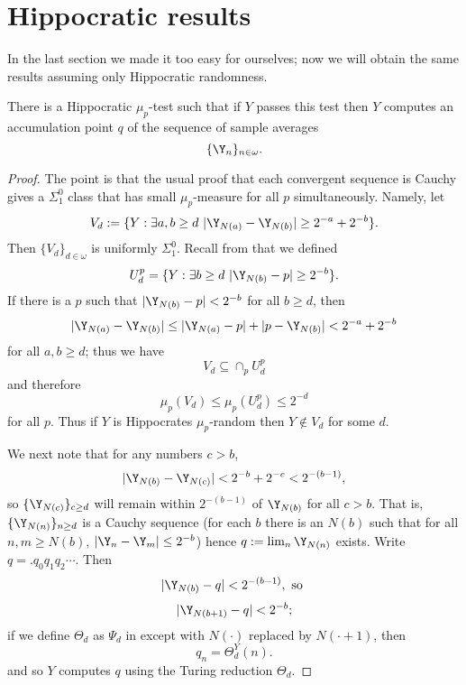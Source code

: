 \section{Hippocratic results}

In the last section we made it too easy for ourselves; now we will obtain the same results assuming only Hippocratic randomness. 

\begin{theorem}\label{accumulate}
There is a Hippocratic $\mu_p$-test such that if $Y$ passes this test then $Y$ computes an accumulation point $q$ of the sequence of sample averages 
\[
\{\Y_n\}_{n\in\omega}.
\] 
\end{theorem}

\begin{proof}
The point is that the usual proof that each convergent sequence is Cauchy gives a $\Sigma^0_1$ class that has small $\mu_p$-measure for all $p$ simultaneously. Namely, let
\[
V_d:=\{Y: \exists a,b\ge d\,\,|\Y_{N(a)}-\Y_{N(b)}|\ge 2^{-a}+ 2^{-b}\}.
\]
Then $\{V_d\}_{d\in\omega}$ is uniformly $\Sigma^0_1$. Recall from  that we defined
\[
U^{p}_d=\{Y:\exists b\ge d\,\, |\Y_{N(b)}-p|\ge 2^{-b}\}.
\]
If there is a $p$ such that $|\Y_{N(b)}-p|<2^{-b}$ for all $b\ge d$, then 
\[
|\Y_{N(a)}-\Y_{N(b)}|\le |\Y_{N(a)}-p|+|p-\Y_{N(b)}|< 2^{-a}+2^{-b}
\]
for all $a,b\ge d$; thus we have 
\[
V_d\subseteq \cap_{p} U^{p}_d
\]
and therefore 
\[
\mu_p(V_d)\le\mu_p(U^{p}_d)\le 2^{-d}
\]
for all $p$. 
 Thus if $Y$ is Hippocrates $\mu_p$-random then $Y\not\in V_d$ for some $d$. %

We next note that for any numbers $c> b$, 
\[
|\Y_{N(b)} - \Y_{N(c)}| < 2^{-b}+2^{-c} < 2^{-(b-1)},
\]
so $\{\Y_{N(c)}\}_{c\ge d}$ will remain within $2^{-(b-1)}$ of $\Y_{N(b)}$ for all $c>b$. That is, $\{\Y_{N(n)}\}_{n\ge d}$ is a Cauchy sequence (for each $b$ there is an $N(b)$ such that for all $n,m\ge N(b)$, $|\Y_n-\Y_m|\le 2^{-b}$) hence $q:=\lim_n \Y_{N(n)}$ exists. Write $q=.q_0q_1q_2\cdots$. Then
\[
|\Y_{N(b)}-q| <  2^{-(b-1)}, \text{ so }
\]
\[
|\Y_{N(b+1)}-q| <  2^{-b};
\]
if we define $\Theta_d$ as $\Psi_d$ in  except with $N(\cdot)$ replaced by $N(\cdot+1)$, then
\[
q_n = \Theta_d^Y(n).
\] 
and so $Y$ computes $q$ using the Turing reduction $\Theta_d$. 
\end{proof}


